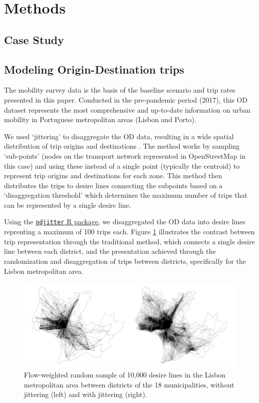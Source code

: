 \documentclass[review, doubleblind, 3p,
authoryear]{elsarticle} %
\begin{document}
\section{Methods}\label{methods}

\subsection{Case Study}\label{case-study}

\subsection{Modeling Origin-Destination
trips}\label{modeling-origin-destination-trips}

The mobility survey data \citep{IMOB} is the basis of the baseline
scenario and trip rates presented in this paper. Conducted in the
pre-pandemic period (2017), this OD dataset represents the most
comprehensive and up-to-date information on urban mobility in Portuguese
metropolitan areas (Lisbon and Porto).

We used `jittering' to disaggregate the OD data, resulting in a wide
spatial distribution of trip origins and destinations
\citep{Lovelace2022Jittering}. The method works by sampling `sub-points'
(nodes on the transport network represented in OpenStreetMap in this
case) and using these instead of a single point (typically the centroid)
to represent trip origins and destinations for each zone. This method
then distributes the trips to desire lines connecting the subpoints
based on a `disaggregation threshold' which determines the maximum
number of trips that can be represented by a single desire line.

Using the
\href{https://github.com/dabreegster/odjitter}{\texttt{odjitter} R
package}, we disaggregated the OD data into desire lines reprenting a
maximum of 100 trips each. Figure \ref{fig:jitter} illustrates the
contrast between trip representation through the traditional method,
which connects a single desire line between each district, and the
presentation achieved through the randomization and disaggregation of
trips between districts, specifically for the Lisbon metropolitan area.

\begin{figure}

{\centering \includegraphics[width=1\linewidth,]{img/jitter_cairo} 

}

\caption{Flow-weighted random sample of 10,000 desire lines in the Lisbon metropolitan area between districts of the 18 municipalities, without jittering (left) and with jittering (right).}\label{fig:jitter}
\end{figure}
\end{document}
